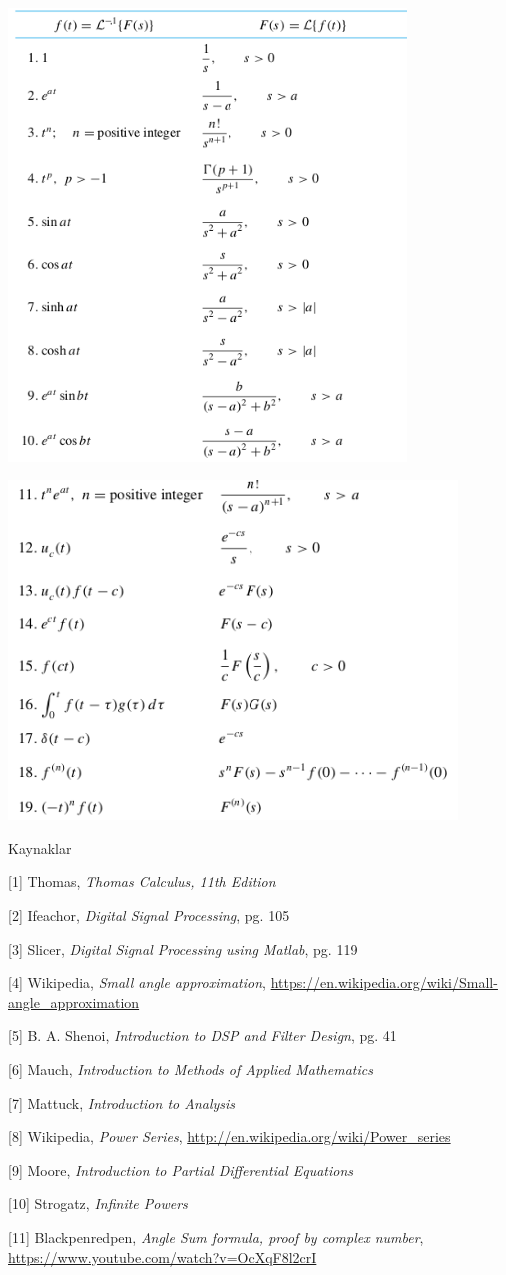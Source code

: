 \documentclass[12pt,fleqn]{article}\usepackage{../../common}
\begin{document}
\includegraphics[height=12cm]{lap_1.png}

\includegraphics[height=9cm]{lap_2.png}

Kaynaklar 

[1] Thomas, {\em Thomas Calculus, 11th Edition}

[2] Ifeachor, {\em Digital Signal Processing}, pg. 105

[3] Slicer, {\em Digital Signal Processing using Matlab}, pg. 119

[4] Wikipedia, {\em Small angle approximation},
    \url{https://en.wikipedia.org/wiki/Small-angle_approximation}

[5] B. A. Shenoi, {\em Introduction to DSP and Filter Design}, pg. 41

[6] Mauch, {\em Introduction to Methods of Applied Mathematics}

[7] Mattuck, {\em Introduction to Analysis}

[8] Wikipedia, {\em Power Series}, \url{http://en.wikipedia.org/wiki/Power_series}

[9] Moore, {\em Introduction to Partial Differential Equations}

[10] Strogatz, {\em Infinite Powers}

[11] Blackpenredpen, {\em Angle Sum formula, proof by complex number},
     \url{https://www.youtube.com/watch?v=OcXqF8l2crI}
\end{document}
